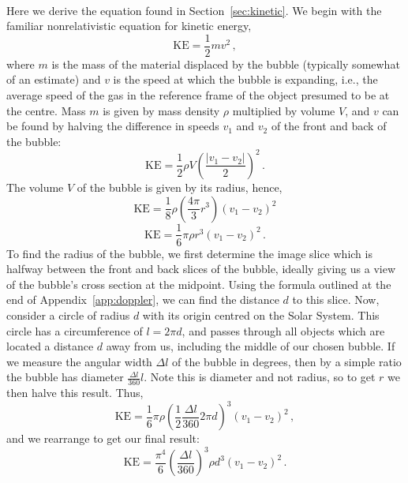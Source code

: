 \documentclass[a4paper, titlepage, oneside]{article}
\begin{document}
\paragraph{}
Here we derive the equation found in Section~\ref{sec:kinetic}. We begin with the familiar nonrelativistic equation for kinetic energy,
\begin{equation}
  \mathrm{KE} = \frac{1}{2} m v ^ 2 \, ,
\end{equation}
where \(m\) is the mass of the material displaced by the bubble (typically somewhat of an estimate) and \(v\) is the speed at which the bubble is expanding, i.e., the average speed of the gas in the reference frame of the object presumed to be at the centre. Mass \(m\) is given by mass density \(\rho\) multiplied by volume \(V\), and \(v\) can be found by halving the difference in speeds \(v_1\) and \(v_2\) of the front and back of the bubble:
\begin{equation}
  \mathrm{KE} = \frac{1}{2} \rho V { \left( \frac{\lvert v_1 - v_2 \rvert}{2} \right) }^2 \, .
\end{equation}
The volume \(V\) of the bubble is given by its radius, hence,
\begin{equation}
  \mathrm{KE} = \frac{1}{8} \rho \left( \frac{4\pi}{3} r^3 \right) {(v_1 - v_2)}^2
\end{equation} \begin{equation}
  \mathrm{KE} = \frac{1}{6} \pi \rho r^3 {(v_1 - v_2)}^2  \, .
\end{equation}
To find the radius of the bubble, we first determine the image slice which is halfway between the front and back slices of the bubble, ideally giving us a view of the bubble's cross section at the midpoint. Using the formula outlined at the end of Appendix~\ref{app:doppler}, we can find the distance \(d\) to this slice. Now, consider a circle of radius \(d\) with its origin centred on the Solar System. This circle has a circumference of \(l = 2 \pi d\), and passes through all objects which are located a distance \(d\) away from us, including the middle of our chosen bubble. If we measure the angular width \(\Delta l\) of the bubble in degrees, then by a simple ratio the bubble has diameter \(\frac{\Delta l}{360}l\). Note this is diameter and not radius, so to get \(r\) we then halve this result. Thus,
\begin{equation}
  \mathrm{KE} = \frac{1}{6} \pi \rho {\left( \frac{1}{2} \frac{\Delta l}{360} 2 \pi d \right)}^3 {(v_1 - v_2)}^2  \, ,
\end{equation}
and we rearrange to get our final result:
\begin{equation}
  \mathrm{KE} = \frac{\pi ^ 4}{6} {\left( \frac{\Delta l}{360} \right)}^3 \rho d^3 {(v_1 - v_2)}^2 \, .
\end{equation}
\end{document}
